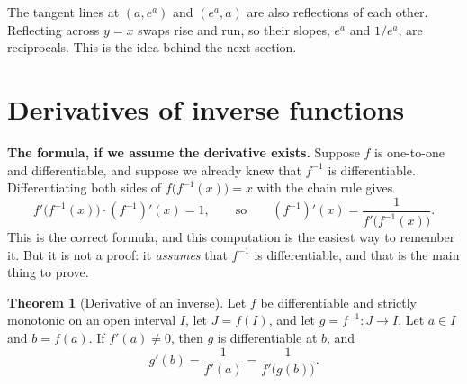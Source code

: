 \documentclass[12pt,letterpaper]{article}
\theoremstyle{definition}
\newtheorem{theorem}{Theorem}[section]
\begin{document}
\begin{center}
\end{center}

The tangent lines at $(a,e^a)$ and $(e^a,a)$ are also reflections of each
other. Reflecting across $y=x$ swaps rise and run, so their slopes, $e^a$ and
$1/e^a$, are reciprocals. This is the idea behind the next section.

\section{Derivatives of inverse functions}

\textbf{The formula, if we assume the derivative exists.} Suppose $f$ is
one-to-one and differentiable, and suppose we already knew that $f^{-1}$ is
differentiable. Differentiating both sides of $f\bigl(f^{-1}(x)\bigr)=x$ with
the chain rule gives
\[
  f'\bigl(f^{-1}(x)\bigr)\cdot(f^{-1})'(x)=1,
  \qquad\text{so}\qquad
  (f^{-1})'(x)=\frac{1}{f'\bigl(f^{-1}(x)\bigr)}.
\]
This is the correct formula, and this computation is the easiest way to
remember it. But it is not a proof: it \emph{assumes} that $f^{-1}$ is
differentiable, and that is the main thing to prove.

\begin{theorem}[Derivative of an inverse]\label{thm:inverse-derivative}
  Let $f$ be differentiable and strictly monotonic on an open interval $I$,
  let $J=f(I)$, and let $g=f^{-1}\colon J\to I$. Let $a\in I$ and $b=f(a)$. If
  $f'(a)\neq0$, then $g$ is differentiable at $b$, and
  \[
    g'(b)=\frac{1}{f'(a)}=\frac{1}{f'\bigl(g(b)\bigr)}.
  \]
\end{theorem}
\end{document}
